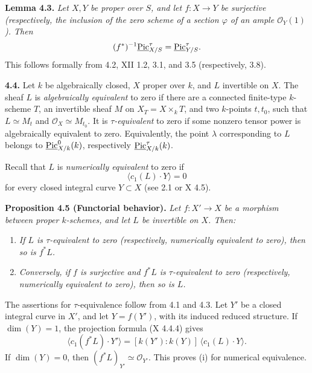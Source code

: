 \textbf{Lemma 4.3.} \emph{Let \(X,Y\) be proper over \(S\), and let
\(f:X\to Y\) be surjective (respectively, the inclusion of the zero
scheme of a section \(\varphi\) of an ample \(\mathcal O_Y(1)\)). Then}
\[
(f^*)^{-1}\underline{\operatorname{Pic}}^\tau_{X/S}
=\underline{\operatorname{Pic}}^\tau_{Y/S}.
\]
This follows formally from 4.2, XII 1.2, 3.1, and 3.5 (respectively,
3.8).

\textbf{4.4.} Let \(k\) be algebraically closed, \(X\) proper over \(k\),
and \(L\) invertible on \(X\). The sheaf \(L\) is \emph{algebraically
equivalent} to zero if there are a connected finite-type \(k\)-scheme
\(T\), an invertible sheaf \(M\) on \(X_T=X\times_kT\), and two
\(k\)-points \(t,t_0\), such that \(L\simeq M_t\) and
\(\mathcal O_X\simeq M_{t_0}\). It is \emph{\(\tau\)-equivalent} to zero
if some nonzero tensor power is algebraically equivalent to zero.
Equivalently, the point \(\lambda\) corresponding to \(L\) belongs to
\(\underline{\operatorname{Pic}}^0_{X/k}(k)\), respectively
\(\underline{\operatorname{Pic}}^\tau_{X/k}(k)\).

Recall that \(L\) is \emph{numerically equivalent} to zero if
\[
\langle c_1(L)\cdot Y\rangle=0
\]
for every closed integral curve \(Y\subset X\) (see 2.1 or X 4.5).

\textbf{Proposition 4.5 (Functorial behavior).} \emph{Let
\(f:X'\to X\) be a morphism between proper \(k\)-schemes, and let \(L\)
be invertible on \(X\). Then:}
\begin{enumerate}[label=(\roman*)]
\item \emph{If \(L\) is \(\tau\)-equivalent to zero (respectively,
numerically equivalent to zero), then so is \(f^*L\).}
\item \emph{Conversely, if \(f\) is surjective and \(f^*L\) is
\(\tau\)-equivalent to zero (respectively, numerically equivalent to
zero), then so is \(L\).}
\end{enumerate}

The assertions for \(\tau\)-equivalence follow from 4.1 and 4.3. Let
\(Y'\) be a closed integral curve in \(X'\), and let \(Y=f(Y')\), with
its induced reduced structure. If \(\dim(Y)=1\), the projection formula
(X 4.4.4) gives
\begin{equation}
\langle c_1(f^*L)\cdot Y'\rangle
=[k(Y'):k(Y)]\,\langle c_1(L)\cdot Y\rangle.
\tag{4.5.1}
\end{equation}
If \(\dim(Y)=0\), then \((f^*L)_{Y'}\simeq\mathcal O_{Y'}\). This proves
(i) for numerical equivalence.

